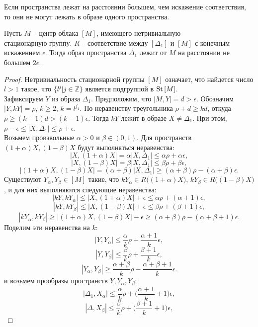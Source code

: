 \begin{corollary}
	Если пространства лежат на расстоянии большем, чем
	искажение соответствия, то они не могут лежать
	в образе одного пространства.
  \end{corollary}
\begin{theorem}
Пусть $M$ -- центр облака $[M]$, имеющего нетривиальную
\\стационарную группу. $R$ -- соответствие между $[\Delta_{1}]$ и $[M]$ с конечным
искажением $\epsilon$. Тогда образ пространства $\Delta_{1}$ лежит от $M$ на
расстоянии не большем $2\epsilon$.
\label{thrmCenterImage}
\end{theorem}
\begin{proof}
Нетривиальность стационарной группы $[M]$ означает, что найдется
число $l > 1$ такое, что $\{l^{j}|j\in \mathbb{Z}\}$ является подгруппой в
$\operatorname{St}{[M]}$.\\
Зафиксируем $Y$ из образа $\Delta_{1}$.
Предположим, что $|M, Y| = d > \epsilon$.  Обозначим
$|Y, kY| = \rho$, $k \ge 2$, $k = l^{j_{1}}$. По неравенству треугольника $\rho + d \ge kd$,
откуда $\rho \ge (k-1)d > (k-1)\epsilon$. Тогда $kY$ лежит в образе
$X \ne \Delta_1$. При этом,
$\rho - \epsilon \le |X, \Delta_1| \le \rho + \epsilon$. \\
Возьмем произвольные $\alpha > 0$ и $\beta \in (0,1)$. Для пространств $(1+\alpha)X, (1-\beta)X$ будут выполняться неравенства:
	$$|X, (1+\alpha)X| = \alpha |X, \Delta_1| \le \alpha\rho + \alpha\epsilon,$$
	$$|X, (1-\beta)X| = \beta|X, \Delta_1| \le \beta\rho + \beta\epsilon,$$
	$$|(1+\alpha) X, (1-\beta)X| = (\alpha + \beta)|X, \Delta_1| \ge (\alpha+\beta)\rho - (\alpha+\beta)\epsilon.$$
 Существуют
$Y_\alpha, Y_\beta \in [M]$ такие, что
$kY_\alpha \in R\big((1+\alpha)X\big)$, $kY_\beta \in R\big((1-\beta)X\big)$, и
для них выполняются следующие неравенства:
	$$|kY, kY_\alpha| \le |X, (1+\alpha)X| + \epsilon \le \alpha\rho + (\alpha+1)\epsilon,$$
	$$|kY, kY_\beta| \le |X, (1-\beta)X| + \epsilon \le \beta\rho + (\beta+1)\epsilon,$$
	$$|kY_\alpha, kY_\beta| \ge |(1+\alpha)X, (1-\beta)X| - \epsilon \ge  (\alpha+\beta)\rho - (\alpha+\beta+1)\epsilon.$$
	Поделим эти неравенства на $k$:
	$$|Y, Y_{\alpha}| \le \frac{\alpha}{k}\rho + \frac{\alpha+1}{k}\epsilon,$$
	$$|Y, Y_{\beta}| \le \frac{\beta}{k}\rho + \frac{\beta+1}{k}\epsilon,$$
	$$|Y_\alpha, Y_{\beta}| \ge \frac{\alpha+\beta}{k}\rho - \frac{\alpha+\beta+1}{k}\epsilon.$$
	и возьмем прообразы пространств $Y, Y_{\alpha}, Y_{\beta}$:
	$$|\Delta_1, X_{\alpha}| \le \frac{\alpha}{k}\rho + \big(\frac{\alpha+1}{k} + 1\big)\epsilon,$$
	$$|\Delta, X_{\beta}| \le \frac{\beta}{k}\rho + \big(\frac{\beta+1}{k}+1\big)\epsilon,$$

\end{proof}
